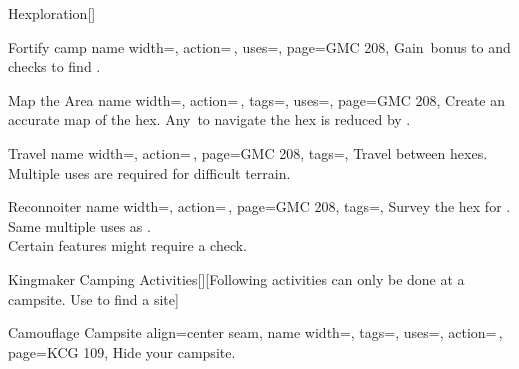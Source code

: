 \begin{PageFrontLandscape}
\begin{TablesHalf}{\frontTableHeight}
\begin{Table}{Hexploration}[]
\begin{entry}{Fortify camp}{%
                name width=\activityLength,%
                action=\,,
                uses=\Crafting,
                page=GMC 208,
            }
                Gain \,\Cirm bonus to  and  checks to find
                .
            \end{entry}
            \begin{entry}{Map the Area}{%
                name width=\activityLength,%
                action=\,,
                tags=\Concentrate,
                uses=\Survival,
                page=GMC 208,
            }
                Create an accurate map of the hex. Any \DC\,to navigate the hex is reduced by . \hfill
            \end{entry}
            \begin{entry}{Travel}{%
                name width=\activityLength,%
                action=\,,
                page=GMC 208,
                tags=\Move,
            }
                Travel between hexes. Multiple uses are required for difficult terrain.\hfill
                \\
            \end{entry}
            \begin{entry}{Reconnoiter}{%
                name width=\activityLength,%
                action=\,,
                page=GMC 208,
                tags=\Concentrate,
            }
                Survey the hex for .
                Same multiple uses as .\hfill
                \\
                Certain features might require a check.
            \end{entry}
        \end{Table}%
        \vfill
        \begin{Table}{Kingmaker Camping Activities}[][Following activities can only be done at a campsite. Use
         to find a site]
            \begin{entry}{Camouflage Campsite}{%
                align=center seam,
                name width=\activityLength,%
                tags=\Manipulate,
                uses={\Stealth[tags={T,S}]},
                action=\,,
                page=KCG 109,
            }
                Hide your campsite.

\end{entry}
\end{Table}
\end{TablesHalf}
\end{PageFrontLandscape}
